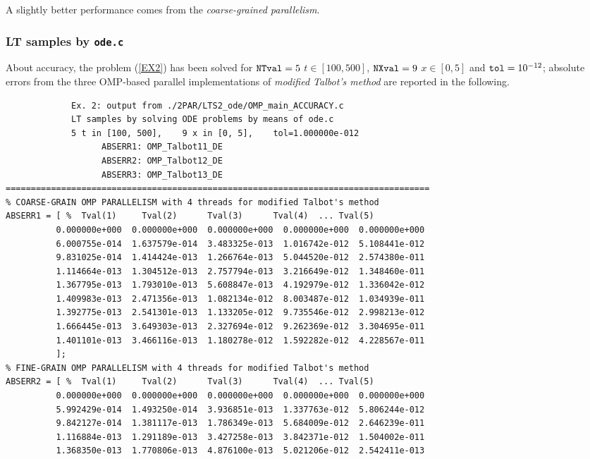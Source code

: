 \documentclass[a4paper,10pt]{report}%
\begin{document}
\noindent A slightly better performance comes from the {\em coarse-grained parallelism}.



\subsubsection{LT samples by {\tt ode.c}}
About accuracy, the problem (\ref{EX2}) has been solved for ${\tt NTval}=5$ $t\in[100, 500]$, ${\tt NXval}=9$
$x\in[0,5]$ and ${\tt tol}=10^{-12}$; absolute errors from the three OMP-based parallel implementations of
{\em modified Talbot's method} are reported in the following.
\begin{lstlisting}
             Ex. 2: output from ./2PAR/LTS2_ode/OMP_main_ACCURACY.c
             LT samples by solving ODE problems by means of ode.c
             5 t in [100, 500],    9 x in [0, 5],    tol=1.000000e-012
                   ABSERR1: OMP_Talbot11_DE
                   ABSERR2: OMP_Talbot12_DE
                   ABSERR3: OMP_Talbot13_DE
====================================================================================
% COARSE-GRAIN OMP PARALLELISM with 4 threads for modified Talbot's method
ABSERR1 = [ %  Tval(1)     Tval(2)      Tval(3)      Tval(4)  ... Tval(5)
          0.000000e+000  0.000000e+000  0.000000e+000  0.000000e+000  0.000000e+000
          6.000755e-014  1.637579e-014  3.483325e-013  1.016742e-012  5.108441e-012
          9.831025e-014  1.414424e-013  1.266764e-013  5.044520e-012  2.574380e-011
          1.114664e-013  1.304512e-013  2.757794e-013  3.216649e-012  1.348460e-011
          1.367795e-013  1.793010e-013  5.608847e-013  4.192979e-012  1.336042e-012
          1.409983e-013  2.471356e-013  1.082134e-012  8.003487e-012  1.034939e-011
          1.392775e-013  2.541301e-013  1.133205e-012  9.735546e-012  2.998213e-012
          1.666445e-013  3.649303e-013  2.327694e-012  9.262369e-012  3.304695e-011
          1.401101e-013  3.466116e-013  1.180278e-012  1.592282e-012  4.228567e-011
          ];
% FINE-GRAIN OMP PARALLELISM with 4 threads for modified Talbot's method
ABSERR2 = [ %  Tval(1)     Tval(2)      Tval(3)      Tval(4)  ... Tval(5)
          0.000000e+000  0.000000e+000  0.000000e+000  0.000000e+000  0.000000e+000
          5.992429e-014  1.493250e-014  3.936851e-013  1.337763e-012  5.806244e-012
          9.842127e-014  1.381117e-013  1.786349e-013  5.684009e-012  2.646239e-011
          1.116884e-013  1.291189e-013  3.427258e-013  3.842371e-012  1.504002e-011
          1.368350e-013  1.770806e-013  4.876100e-013  5.021206e-012  2.542411e-013

\end{lstlisting}
\end{document}
